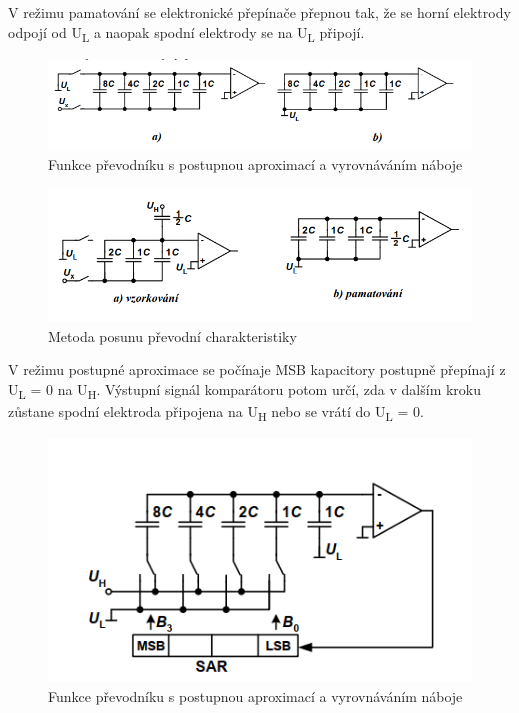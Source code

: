 V režimu pamatování se elektronické přepínače přepnou tak, že se horní elektrody odpojí od U\textsubscript{L} a naopak spodní elektrody se na U\textsubscript{L} připojí.
\begin{figure}[h]
   \begin{center}
     \includegraphics[scale=0.6]{images/ADprox.png}
   \end{center}
   \caption{Funkce převodníku s postupnou aproximací a vyrovnáváním náboje}
\end{figure}
\begin{figure}[h]
   \begin{center}
     \includegraphics[scale=0.6]{images/ADprox3.png}
   \end{center}
   \caption{Metoda posunu převodní charakteristiky}
\end{figure}

\pagebreak
V režimu postupné aproximace se počínaje MSB kapacitory postupně přepínají z U\textsubscript{L} = 0 na U\textsubscript{H}. Výstupní signál komparátoru potom určí, zda v dalším kroku zůstane spodní elektroda připojena na U\textsubscript{H} nebo se vrátí do U\textsubscript{L} = 0.
\begin{figure}[h]
   \begin{center}
     \includegraphics[scale=0.6]{images/ADprox2.png}
   \end{center}
   \caption{Funkce převodníku s postupnou aproximací a vyrovnáváním náboje}
\end{figure}


